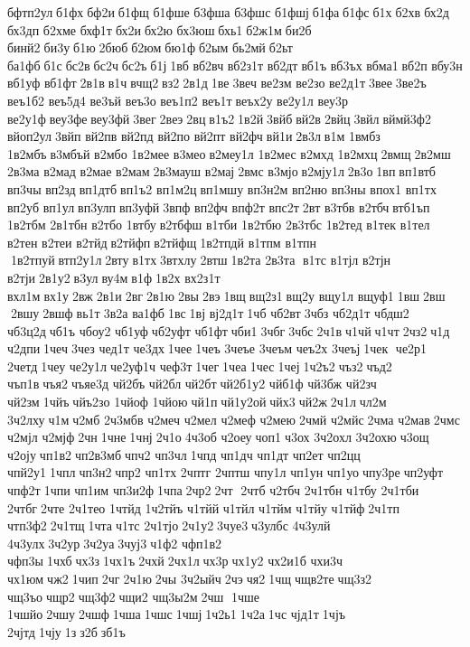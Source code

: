 бфтп2ул б1фх бф2и б1фщ 	б1фше 	б3фша 	б3фшс 	б1фшј б1фа б1фс б1х б2хв бх2д 	бх3дп 	б2хме 	бхф1т бх2и бх2ю 	бх3юш бхь1 б2ж1м би2б 	бинй2 би3у б1ю 2бюб б2юм бю1ф б2ым 	бь2мй б2ьт 	ба1фб б1с бс2в бс2ч бс2ъ б1ј 1вб 	вб2вч 
вб2з1т 	вб2дт вб1ъ 	вб3ъх 	вбма1 вб2п 	вбу3н 	вб1уф 	вб1фт 2в1в в1ч вчщ2 вз2 2в1д 1ве 3веч 	ве2зм 	ве2зо 
ве2д1т 3вее 3ве2ъ 
веъ1б2 
веъ5д4 	ве3ъй 	веъ3о 
веъ1п2 	веъ1т веъх2у 
ве2у1л 	веу3р 
ве2у1ф веу3фе веу3фй 3вег 2веэ 2вц в1ъ2 1в2й 3вйб вй2в 2вйц 3вйл вймй3ф2 
вйоп2ул 3вйп 	вй2пв 	вй2пд 	вй2по 	вй2пт 	вй2фч вй1и 2в3л в1м 	1вмбз 
1в2мбъ в3мбъй 	в2мбо 
1в2мее 	в3мео в2меу1л 
1в2мес 	в2мхд 
1в2мхц 2вмщ 2в2мш 	2в3ма  	в2мад 	в2мае 	в2мам 2в3мауш 	в2мај 2вмс 	в3мјо в2мју1л 2в3о 1вп вп1втб 	вп3чы 	вп2зд вп1дтб вп1ъ2 
вп1м2ц вп1мшу 
вп3н2м 	вп2ню 	вп3ны 	впох1 	вп1тх 	вп2уб 	вп1ул вп3улп вп3уфй 3впф 	вп2фч 	впф2т 	впс2т 2вт  	в3тбв 	в2тбч втб1ъп 
1в2тбм 
2в1тбн 	в2тбо 	1втбу в2тбфш 	в1тби 
1в2тбю 
2в3тбс 
1в2тед 	в1тек 	в1тел 	в2тен 	в2теи 	в2тйд в2тйфп в2тйфщ 1в2тпдй 	в1тпм 
в1тпн  1в2тпуй втп2у1л 2вту в1тх 3втхлу 2втш 1в2та 	2в3та  в1тс 	в1тјл 	в2тјн 	в2тји 2в1у2 в3ул ву4м в1ф 1в2х 
вх2з1т 	вхл1м вх1у 2вж 2в1и 2вг 2в1ю 2вы 2вэ 1вщ вщ2з1 вщ2у 	вщу1л 	вщуф1 1вш 2вш  2вшу 2вшф вь1т 3в2а 	ва1фб 1вс 1вј 
вј2д1т 1чб 	чб2вт 3чбз 
чб2д1т 	чбдш2 
чб3ц2д чб1ъ 	чбоу2 	чб1уф чб2уфт 	чб1фт чби1 3чбг 3чбс 2ч1в ч1чй ч1чт 2чз2 ч1д 	ч2дпи 1чеч 3чез 	чед1т 	че3дх 1чее 1чеъ 	3чеъе 	3чеъм 	чеъ2х 	3чеъј 1чек  че2р1 	2четд 1чеу 
че2у1л че2уф1ч 	чеф3т 1чег 1чеа 1чес 1чеј 1ч2ъ2 чъз2 чъд2 	чъп1в чъя2 чъяе3д 	чй2бъ 	чй2бл 	чй2бт чй2б1у2 	чйб1ф 	чй3бж 	чй2зч 	чй2зм 1чйъ чйъ2зо 	1чйоф 	1чйою чй1п чй1у2ой чйх3 чй2ж 2ч1л чл2м 
3ч2лху ч1м ч2мб 
2ч3мбв 	ч2меч 	ч2мел 	ч2меф 	ч2мею 2чмй 	ч2мйс 2чма 	ч2мав 2чмс 	ч2мјл 	ч2мјф 2чн 1чне 1чнј 2ч1о 4ч3об 	ч2оеу чоп1 ч3ох  
3ч2охл 
3ч2охю ч3ощ 	ч2оју чп1в2 чп2в3мб чпч2 	чп3чл 1чпд 	чп1дч 	чп1дт 	чп2ет 	чп2цц 
чпй2у1 1чпл чп3н2 чпр2 	чп1тх 	2чптг 	2чптш 	чпу1л 	чп1ун 	чп1уо чпу3ре чп2уфт 	чпф2т 1чпи 	чп1им 
чп3и2ф 1чпа 2чр2 2чт  2чтб  	ч2тбч 
2ч1тбн 	ч1тбу 
2ч1тби 	2чтбг 2чте  
2ч1тео 	1чтйд 
1ч2тйъ 	ч1тйй 	ч1тйл 	ч1тйм 	ч1тйу 	ч1тйф 2ч1тп 
чтп3ф2 2ч1тщ 1чта ч1тс 
2ч1тјо 2ч1у2 3чуе3 ч3улбс 
4ч3улй 
4ч3улх 3ч2ур 3ч2уа 3чуј3 ч1ф2 
чфп1в2 	чфп3ы 1чхб чх3з 1чх1ъ 2чхй 2чх1л чх3р чх1у2 
чх2и1б 	чхи3ч 	чх1юм чж2 1чип 2чг 2ч1ю 2чы 
3ч2ыйч 2чэ чя2 1чщ чщв2те чщ3з2 	чщ3ъо чщр2 чщ3ф2 чщи2 
чщ3ы2м 2чш  1чше 	1чшйо 2чшу 2чшф 1чша 1чшс 1чшј 1ч2ь1 1ч2а 1чс 	чјд1т 1чјъ 	2чјтд 1чју 1з з2б зб1ъ 
